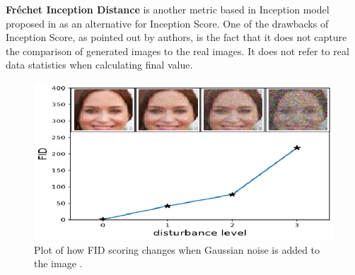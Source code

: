 \documentclass[12pt,a4paper,openany]{book}
\begin{document}
%
%
%
%
%

\noindent \textbf{Fr\'echet Inception Distance} is another metric based in Inception model proposed in \cite{fid} as an alternative for Inception Score. One of the drawbacks of Inception Score, as pointed out by authors, is the fact that it does not capture the comparison of generated images to the real images. It does not refer to real data statistics when calculating final value.

 \begin{figure}[ht!]
     \centering
     \includegraphics[scale=1.6]{figs/fid.eps}
     \caption{Plot of how FID scoring changes when Gaussian noise is added to the image \cite{fid}.}\label{Fig:FID}
 \end{figure}
 
\end{document}
